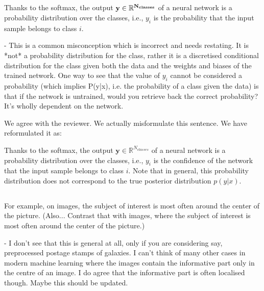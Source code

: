 \documentclass[12pt,a4paper]{article}
\newcommand{\nati}[1]{{\color[rgb]{.1,.6,.1}{NP: #1}}}
\newcommand{\todo}[1]{{\color[rgb]{.6,.1,.6}{TODO: #1}}}
\renewcommand{\b}[1]{{\bm{#1}}}   %
\newcommand{\1}{\b{1}}              %
\newcommand{\0}{\b{0}}              %
\newcommand{\y}{\b{y}}
\newcommand{\R}{\mathbb{R}}
\begin{document}
\subsection{}
\begin{mdframed}[style=comment]
Thanks to the softmax, the output $\bf{y}\in\mathbb{R}^{N_{classes}}$ of a neural network is a probability distribution over the classes, i.e., $y_i$ is the probability that the input sample belongs to class $i$.

- This is a common misconception which is incorrect and needs restating. It is *not* a probability distribution for the class, rather it is a discretised conditional distribution for the class given both the data and the weights and biases of the trained network. One way to see that the value of $y_i$ cannot be considered a probability (which implies P(y|x), i.e. the probability of a class given the data) is that if the network is untrained, would you retrieve back the correct probability? It's wholly dependent on the network.
\end{mdframed}

We agree with the reviewer. We actually misformulate this sentence. We have reformulated it as:
\begin{mdframed}[style=manuscript]
Thanks to the softmax, the output $\y \in \R^{N_{classes}}$ of a neural network is a probability distribution over the classes, i.e., $y_i$ is the confidence of the network that the input sample belongs to class $i$. Note that in general, this probability distribution does not correspond to the true posterior distribution $p(y|x)$.
\end{mdframed}

\nati{By the way, this mean that the reviewer is knowledgable with ML, and may be Bayesian. He might be working on another spherical approach.}

\subsection{}
\begin{mdframed}[style=comment]
For example, on images, the subject of interest is most often around the center of the picture. (Also... Contrast that with images, where the subject of interest is most often around the center of the picture.)

- I don't see that this is general at all, only if you are considering say, preprocessed postage stamps of galaxies. I can't think of many other cases in modern machine learning where the images contain the informative part only in the centre of an image. I do agree that the informative part is often localised though. Maybe this should be updated.
\end{mdframed}
\todo{Assigned: @michael}
\end{document}
